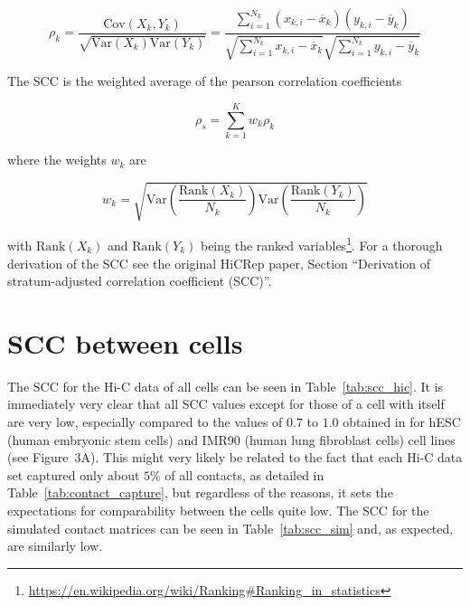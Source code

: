 \documentclass[a4paper,11pt,oneside,final,english,toc=bib,draft]{scrbook}
\begin{document}
\[
  \rho_k = \frac{ \mathrm{Cov}(X_k,Y_k) }{ \sqrt{ \mathrm{Var}(X_k) \mathrm{Var}(Y_k)} } = \frac{ \sum_{i=1}^{N_k} (x_{k,i} - \overbar{x}_k) (y_{k,i} - \overbar{y}_k) }{ \sqrt{ \sum_{i=1}^{N_k} x_{k,i} - \overbar{x}_k } \sqrt{ \sum_{i=1}^{N_k} y_{k,i} - \overbar{y}_k } }
\]

The SCC is the weighted average of the pearson correlation coefficients

\[
  \rho_s = \sum_{k=1}^{K} w_k \rho_k
\]

where the weights \(w_k\) are

\[
  w_k = \sqrt{ \mathrm{Var}\left( \frac{ \mathrm{Rank}(X_k) }{ N_k } \right) \mathrm{Var}\left( \frac{ \mathrm{Rank}(Y_k) }{ N_k } \right) }
\]

with \( \mathrm{Rank}(X_k) \) and \( \mathrm{Rank}(Y_k) \) being the ranked variables\footnote{\url{https://en.wikipedia.org/wiki/Ranking\#Ranking_in_statistics}}. For a thorough derivation of the SCC see the original HiCRep paper\cite{yang_hicrep_2017}, Section \enquote{Derivation of stratum-adjusted correlation coefficient (SCC)}.


\section{SCC between cells} %
\label{sec:scc_between_cells}

The SCC for the Hi-C data of all cells can be seen in Table~\ref{tab:scc_hic}. It is immediately very clear that all SCC values except for those of a cell with itself are very low, especially compared to the values of \(0.7\) to \(1.0\) obtained in \cite{yang_hicrep_2017} for hESC (human embryonic stem cells) and IMR90 (human lung fibroblast cells) cell lines (see Figure~3A). This might very likely be related to the fact that each Hi-C data set captured only about \(5\%\) of all contacts, as detailed in Table~\ref{tab:contact_capture}, but regardless of the reasons, it sets the expectations for comparability between the cells quite low. The SCC for the simulated contact matrices can be seen in Table~\ref{tab:scc_sim} and, as expected, are similarly low.
\end{document}
